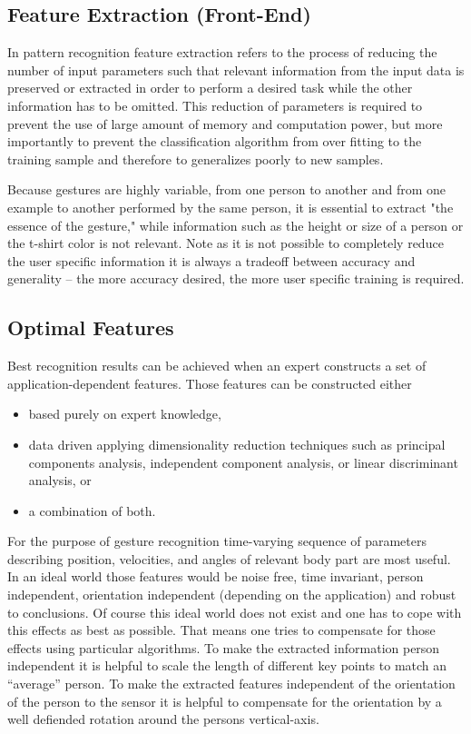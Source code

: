 \documentclass[titlepage,12pt,a4paper]{article}
\begin{document}
\subsection{Feature Extraction (Front-End)}

In pattern recognition feature extraction refers to the process of reducing the number of input parameters such that relevant information from the input data is preserved or extracted in order to perform a desired task while the other information has to be omitted. This reduction of parameters is required to prevent the use of large amount of memory and computation power, but more importantly to prevent the classification algorithm from over fitting to the training sample and therefore to generalizes poorly to new samples.

Because gestures are highly variable, from one person to another and from one example to another performed by the same person, it is essential to extract "the essence of the gesture," while information such as the height or size of a person or the t-shirt color is not relevant. Note as it is not possible to completely reduce the user specific information it is always a tradeoff between accuracy and generality -- the more accuracy desired, the more user specific training is required. 

\subsection{Optimal Features}
Best recognition results can be achieved when an expert constructs a set of application-dependent features. Those features can be constructed either 
\begin{itemize}
	\item based purely on expert knowledge, 
	\item data driven applying dimensionality reduction techniques such as principal components analysis, independent component analysis, or linear discriminant analysis, or
	\item a combination of both. 
\end{itemize}

For the purpose of gesture recognition time-varying sequence of parameters describing position, velocities, and angles of relevant body part are most useful. 
In an ideal world those features would be noise free, time invariant, person independent, orientation independent (depending on the application) and robust to conclusions. Of course this ideal world does not exist and one has to cope with this effects as best as possible. That means one tries to compensate for those effects using particular algorithms. To make the extracted information person independent it is helpful to scale the length of different key points to match an “average” person. To make the extracted features independent of the orientation of the person to the sensor it is helpful to compensate for the orientation by a well defiended rotation around the persons vertical-axis.
\end{document}
